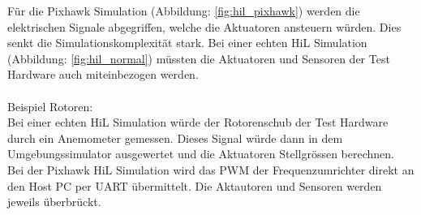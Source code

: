 \noindent
Für die Pixhawk Simulation (Abbildung: \ref{fig:hil_pixhawk}) werden die elektrischen Signale abgegriffen, welche die Aktuatoren ansteuern würden. Dies senkt die Simulationskomplexität stark. Bei einer echten HiL Simulation (Abbildung: \ref{fig:hil_normal}) müssten die Aktuatoren und Sensoren der Test Hardware auch miteinbezogen werden.\\\\
Beispiel Rotoren:\\
Bei einer echten HiL Simulation würde der Rotorenschub der Test Hardware durch ein Anemometer gemessen. Dieses Signal würde dann in dem Umgebungssimulator ausgewertet und die Aktuatoren Stellgrössen berechnen.\\
Bei der Pixhawk HiL Simulation wird das PWM der Frequenzumrichter direkt an den Host PC per UART übermittelt. Die Aktautoren und Sensoren werden jeweils überbrückt.

\clearpage